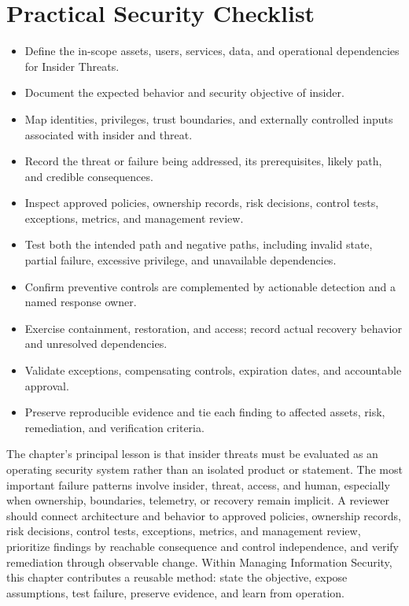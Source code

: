 \documentclass[11pt]{article}
\begin{document}
\section*{Practical Security Checklist}
\begin{itemize}[label=$\square$]
\item Define the in-scope assets, users, services, data, and operational dependencies for Insider Threats.
\item Document the expected behavior and security objective of insider.
\item Map identities, privileges, trust boundaries, and externally controlled inputs associated with insider and threat.
\item Record the threat or failure being addressed, its prerequisites, likely path, and credible consequences.
\item Inspect approved policies, ownership records, risk decisions, control tests, exceptions, metrics, and management review.
\item Test both the intended path and negative paths, including invalid state, partial failure, excessive privilege, and unavailable dependencies.
\item Confirm preventive controls are complemented by actionable detection and a named response owner.
\item Exercise containment, restoration, and access; record actual recovery behavior and unresolved dependencies.
\item Validate exceptions, compensating controls, expiration dates, and accountable approval.
\item Preserve reproducible evidence and tie each finding to affected assets, risk, remediation, and verification criteria.
\end{itemize}
\begin{synthesisbox}
The chapter's principal lesson is that insider threats must be evaluated as an operating security system rather than an isolated product or statement. The most important failure patterns involve insider, threat, access, and human, especially when ownership, boundaries, telemetry, or recovery remain implicit. A reviewer should connect architecture and behavior to approved policies, ownership records, risk decisions, control tests, exceptions, metrics, and management review, prioritize findings by reachable consequence and control independence, and verify remediation through observable change. Within Managing Information Security, this chapter contributes a reusable method: state the objective, expose assumptions, test failure, preserve evidence, and learn from operation.
\end{synthesisbox}
\end{document}
